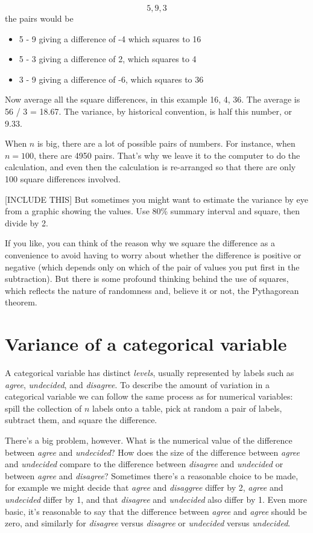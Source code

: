 \documentclass[]{book}
\providecommand{\tightlist}{%
  \setlength{\itemsep}{0pt}\setlength{\parskip}{0pt}}
\begin{document}
\[5, 9,  3\]
the pairs would be

\begin{itemize}
\tightlist
\item
  5 - 9 giving a difference of -4 which squares to 16
\item
  5 - 3 giving a difference of 2, which squares to 4
\item
  3 - 9 giving a difference of -6, which squares to 36
\end{itemize}

Now average all the square differences, in this example 16, 4, 36. The average is 56 / 3 = 18.67. The variance, by historical convention, is half this number, or 9.33.

When \(n\) is big, there are a lot of possible pairs of numbers. For instance, when \(n = 100\), there are 4950 pairs. That's why we leave it to the computer to do the calculation, and even then the calculation is re-arranged so that there are only 100 square differences involved.

{[}INCLUDE THIS{]} But sometimes you might want to estimate the variance by eye from a graphic showing the values. Use 80\% summary interval and square, then divide by 2.

If you like, you can think of the reason why we square the difference as a convenience to avoid having to worry about whether the difference is positive or negative (which depends only on which of the pair of values you put first in the subtraction). But there is some profound thinking behind the use of squares, which reflects the nature of randomness and, believe it or not, the Pythagorean theorem.

\hypertarget{variance-of-a-categorical-variable}{%
\section{Variance of a categorical variable}\label{variance-of-a-categorical-variable}}

A categorical variable has distinct \emph{levels}, usually represented by labels such as \emph{agree}, \emph{undecided}, and \emph{disagree}. To describe the amount of variation in a categorical variable we can follow the same process as for numerical variables: spill the collection of \(n\) labels onto a table, pick at random a pair of labels, subtract them, and square the difference.

There's a big problem, however. What is the numerical value of the difference between \emph{agree} and \emph{undecided}? How does the size of the difference between \emph{agree} and \emph{undecided} compare to the difference between \emph{disagree} and \emph{undecided} or between \emph{agree} and \emph{disagree}? Sometimes there's a reasonable choice to be made, for example we might decide that \emph{agree} and \emph{disaggree} differ by 2, \emph{agree} and \emph{undecided} differ by 1, and that \emph{disagree} and \emph{undecided} also differ by 1. Even more basic, it's reasonable to say that the difference between \emph{agree} and \emph{agree} should be zero, and similarly for \emph{disagree} versus \emph{disagree} or \emph{undecided} versus \emph{undecided}.
\end{document}
